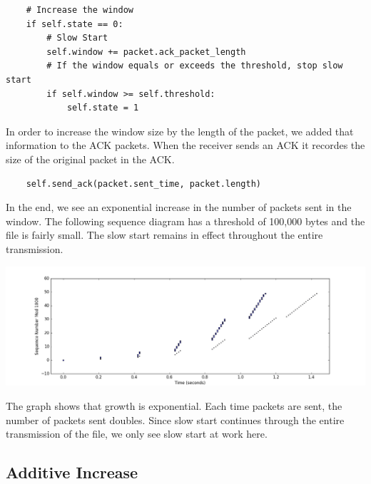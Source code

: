 \documentclass[11pt]{article}
\begin{document}
\vspace{5mm}

\begin{lstlisting}
    # Increase the window
    if self.state == 0:
        # Slow Start
        self.window += packet.ack_packet_length
        # If the window equals or exceeds the threshold, stop slow start
        if self.window >= self.threshold:
            self.state = 1
\end{lstlisting}

\vspace{5mm}

In order to increase the window size by the length of the packet, we added that information to the ACK packets. When the receiver sends an ACK it recordes the size of the original packet in the ACK.

\vspace{5mm}

\begin{lstlisting}
    self.send_ack(packet.sent_time, packet.length)
\end{lstlisting}

\vspace{5mm}

In the end, we see an exponential increase in the number of packets sent in the window. The following sequence diagram has a threshold of 100,000 bytes and the file is fairly small. The slow start remains in effect throughout the entire transmission.

\vspace{5mm}

\includegraphics[width=17cm]{charts/slowstart.png}

\vspace{5mm}

The graph shows that growth is exponential. Each time packets are sent, the number of packets sent doubles. Since slow start continues through the entire transmission of the file, we only see slow start at work here.

\subsection{Additive Increase}
\end{document}

